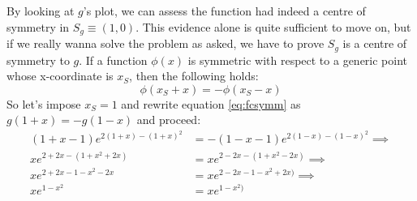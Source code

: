 By looking at $g$'s plot, we can assess the function had indeed a centre of symmetry
in $S_g \equiv (1,0)$. This evidence alone is quite sufficient to move on, but if we really wanna
solve the problem as asked, we have to prove $S_g$ is a centre of symmetry to $g$.
If a function $\phi(x)$
is symmetric with respect to a generic point whose x-coordinate is $x_S$, then the
following holds:
\begin{equation}\label{eq:fcsymm}
    \phi(x_S + x) = - \phi(x_S - x)
\end{equation}
So let's impose $x_S = 1$ and rewrite
equation \ref{eq:fcsymm} as $g(1 + x) = - g(1 - x)$ and proceed:
\begin{equation*}
    \begin{split}
        (1 + x - 1)e^{2(1 + x) - (1 + x)^2} &= - (1 - x - 1)e^{2(1 - x) - (1 - x)^2} \implies\\
        xe^{2 + 2x - (1 + x^2 + 2x)} &= xe^{2 - 2x - (1 + x^2 - 2x)} \implies\\
        xe^{2 + 2x - 1 - x^2 - 2x} &= xe^{2 - 2x - 1 - x^2 + 2x)} \implies\\
        xe^{1 - x^2} &= xe^{1 - x^2)}
    \end{split}
\end{equation*}

